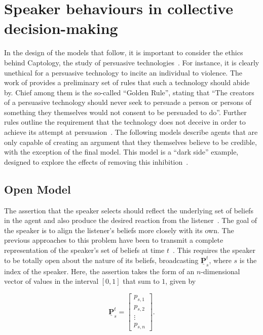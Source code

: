 \section{Speaker behaviours in collective decision-making} \label{sect:speaker_models}

In the design of the models that follow, it is important to consider the ethics behind Captology, the study of persuasive technologies~\cite{Atkinson2006Captology:Review}. For instance, it is clearly unethical for a persuasive technology to incite an individual to violence. The work of \cite{Berdichievsky1999TowardsTechnology} provides a preliminary set of rules that such a technology should abide by. Chief among them is the so-called ``Golden Rule'', stating that ``The creators of a persuasive technology should never seek to persuade a person or persons of something they themselves would not consent to be persuaded to do''. Further rules outline the requirement that the technology does not deceive in order to achieve its attempt at persuasion~\cite{Calvo2014TheComputing}. The following models describe agents that are only capable of creating an argument that they themselves believe to be credible, with the exception of the final model. This model is a ``dark side'' example, designed to explore the effects of removing this inhibition~\cite{Berdichievsky1999TowardsTechnology}.

\subsection*{Open Model}

The assertion that the speaker selects should reflect the underlying set of beliefs in the agent and also produce the desired reaction from the listener~\cite{Lewis2002Convention:Study}. The goal of the speaker is to align the listener's beliefs more closely with its own. The previous approaches to this problem have been to transmit a complete representation of the speaker's set of beliefs at time $t$~\cite{Degroot1974ReachingConsensus, Lee2018CombiningConsensus, Friedkin1999SocialChange, Hegselmann2002OpinionSimulation}. This requires the speaker to be totally open about the nature of its beliefs, broadcasting  $\underline{\mathbf{P}}_{s}^t$, where $s$ is the index of the speaker. Here, the assertion takes the form of an $n$-dimensional vector of values in the interval $[0,1]$ that sum to $1$, given by

\begin{center}
\begin{equation}
\underline{\mathbf{P}}^t_s = \begin{bmatrix} p_{s, 1}\\ p_{s, 2}\\ \vdots \\ p_{s, n} \end{bmatrix}.
\end{equation}
\end{center}


